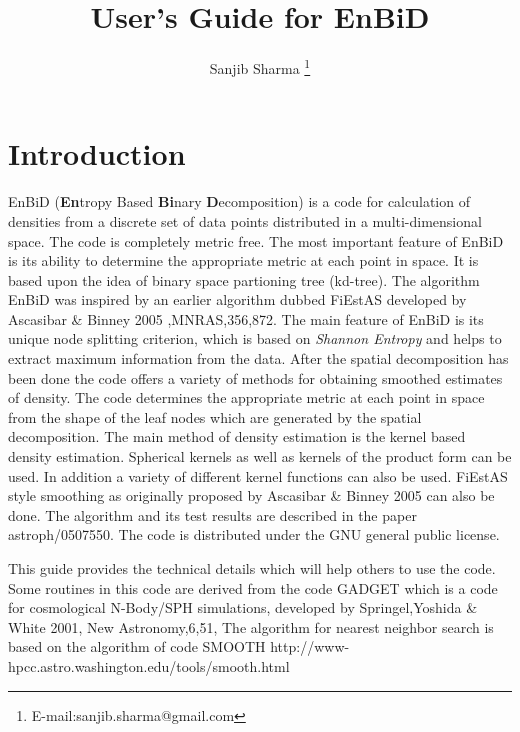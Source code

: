 \documentclass{article}
\title{User's Guide for EnBiD}
\author{Sanjib Sharma \thanks{E-mail:sanjib.sharma@gmail.com}}
\begin{document}
\maketitle

\tableofcontents
\section{Introduction} \label{sec:intro}
EnBiD ({\bf En}tropy Based {\bf Bi}nary {\bf D}ecomposition) is a code
for calculation of densities from a discrete set of data points 
distributed in a multi-dimensional space.  The code is completely 
metric free. The most important feature of EnBiD  is its ability 
to determine the appropriate metric at  each point in space. 
It is based upon the
idea of binary space partioning tree (kd-tree). The algorithm EnBiD 
was inspired by an earlier algorithm dubbed FiEstAS 
developed by Ascasibar \& Binney 2005 ,MNRAS,356,872. 
The main feature of EnBiD is its unique node splitting
criterion, which is  based on {\it Shannon Entropy} and helps
to extract maximum information from the data. 
After the spatial decomposition has been done the code 
offers a variety of methods for obtaining smoothed estimates of density.
The code determines the appropriate metric at each point in space
from  the shape of the leaf nodes which are generated by the spatial decomposition.
The main method of density estimation is the kernel based density 
estimation.  Spherical kernels as well as kernels of the product form  can be 
used. In addition a variety of different kernel functions can also be used.
FiEstAS style smoothing as originally proposed by Ascasibar \& Binney 2005 
can also be done. The algorithm and its test results are described in the 
paper  astroph/0507550. The code is distributed under the GNU general 
public license. 

This guide provides the technical details which 
will help others to use the code. 
Some routines in this  code are derived from the code GADGET 
which is a code for cosmological N-Body/SPH simulations,
developed by Springel,Yoshida \& White 2001, New Astronomy,6,51,
The algorithm for nearest neighbor search is based 
on the algorithm of code SMOOTH 
\newline
http://www-hpcc.astro.washington.edu/tools/smooth.html
\end{document}
